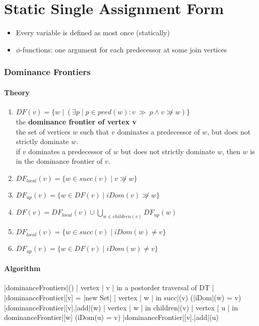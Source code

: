 \documentclass[a4paper,12pt, notitlepage]{article}
\newcommand{\gge}{\ \underline{\gg}\ }
\newcommand{\existe}[3]{(\exists #1 \mid #2 : #3)}
\begin{document}
\section*{Static Single Assignment Form}
\begin{itemize}
\item Every variable is defined as most once (statically)
\item $\phi$-functions: one argument for each predecessor at some join vertices
\end{itemize}

\subsubsection*{Dominance Frontiers}
\paragraph*{Theory}
\begin{enumerate}
\item $DF(v) = \{w \mid \existe{p}{p \in pred(w)}{v \gge p \land v \not\gg w}\}$
\\ the \textbf{dominance frontier of vertex v}
\\ the set of vertices $w$ such that $v$ dominates a predecessor of $w$, but does
not strictly dominate $w$.
\\ if $v$ dominates a predecessor of $w$ but does not strictly dominate $w$,
    then $w$ is in the dominance frontier of $v$.
\item $DF_{local}(v) = \{w \in succ(v) \mid v \not\gg w\}$
\item $DF_{up}(v) = \{w \in DF(v) \mid iDom(v) \not\gg w\}$
\item $DF(v) = DF_{local}(v) \cup 
    \displaystyle \bigcup_{w \in children(v)} DF_{up}(w)$
\item $DF_{local}(v) = \{w \in succ(v) \mid iDom(w) \not= v\}$
\item $DF_{up}(v) = \{w \in DF(v) \mid iDom(w) \not= v\}$
\end{enumerate}

\paragraph*{Algorithm}
\begin{program}
\PROC |dominanceFrontiers|() \BODY
    \FOREACH | vertex | v | in a postorder traversal of DT | \DO
        |dominanceFrontier|[v] = |new Set|
        \FOREACH | vertex | w | in succ|(v) \DO
            \IF (|iDom|(w) \not= v) \AR*
                |dominanceFrontier|[v].|add|(w)
            \FI
        \OD
        \FOREACH | vertex | w | in children|(v) \DO
            \FOREACH | vertex | u | in dominanceFrontier|[w] \DO
                \IF (iDom(u) \not= v) \AR*
                    |dominanceFrontier|[v].|add|(u)
                \FI
            \OD
        \OD
    \OD
\end{program}
\end{document}
